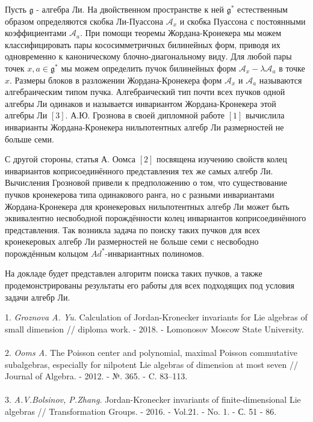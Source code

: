 \documentclass{vzmsthesis}
\begin{document}


\vzmscaption



Пусть $\mathfrak{g}$ - алгебра Ли. На двойственном пространстве к ней $\mathfrak{g}^{\ast}$ естественным образом определяются скобка Ли-Пуассона $\mathcal{A}_{x}$ и скобка Пуассона с постоянными коэффициентами $\mathcal{A}_{a}$. При помощи теоремы Жордана-Кронекера мы можем классифицировать пары кососимметричных билинейных форм, приводя их одновременно к каноническому блочно-диагональному виду. Для любой пары точек $x,a \in\mathfrak{g}^{\ast}$ мы можем определить пучок билинейных форм $\mathcal{A}_{x} - \lambda \mathcal{A}_{a}$ в точке $x$. Размеры блоков в разложении Жордана-Кро\-не\-ке\-ра форм $\mathcal{A}_{x}$ и $\mathcal{A}_{a}$ называются алгебраическим типом пучка. Алгебраический тип почти всех пучков одной алгебры Ли одинаков и называется инвариантом Жордана-Кронекера этой алгебры Ли $\left[ 3 \right]$. А.Ю. Грознова в своей дипломной работе $\left[ 1 \right]$ вычислила инварианты Жордана-Кронекера нильпотентных алгебр Ли размерностей не больше семи.

С другой стороны, статья А. Оомса $\left[ 2 \right] $ посвящена изучению свойств колец инвариантов коприсоединённого представления тех же самых алгебр Ли. Вычисления Грозновой привели к предположению о том, что существование пучков кронекерова типа одинакового ранга, но с разными инвариантами Жордана-Кронекера для кронекеровых нильпотентных алгебр Ли может быть эквивалентно несвободной порождённости колец инвариантов коприсоединённого представления. Так возникла задача по поиску таких пучков для всех кронекеровых алгебр Ли размерностей не больше семи с несвободно порождённым кольцом $Ad^{\ast}$-инвариантных полиномов.

На докладе будет представлен алгоритм поиска таких пучков, а также продемонстрированы результаты его работы для всех подходящих под условия задачи алгебр Ли.

\litlist


1. {\it Groznova A. Yu.}
Calculation of Jordan-Kronecker in\-va\-riants for Lie algebras of small dimension // diploma work. - 2018. - Lomonosov Moscow State University.\\
\\
2. {\it Ooms A.} 
The Poisson center and polynomial, maximal Poisson commutative subalgebras, especially for nilpotent Lie algebras of dimension at most seven // Journal of Algebra. - 2012. - №. 365. - C. 83--113.\\
\\
3. {\it A.V.Bolsinov, P.Zhang.} 
Jordan-Kronecker invariants of finite-dimensional Lie algebras // Transformation Groups. - 2016. -   Vol.21. - No. 1. -  С. 51 - 86.
\end{document}
